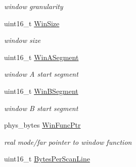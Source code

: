 \begin{DoxyCompactItemize}
\begin{DoxyCompactList}\small\item\em window granularity \end{DoxyCompactList}\item 
uint16\+\_\+t \hyperlink{struct____attribute_____ad26e754fe362f3085c7ec4c0e5e75a6f}{Win\+Size}\hypertarget{struct____attribute_____ad26e754fe362f3085c7ec4c0e5e75a6f}{}\label{struct____attribute_____ad26e754fe362f3085c7ec4c0e5e75a6f}

\begin{DoxyCompactList}\small\item\em window size \end{DoxyCompactList}\item 
uint16\+\_\+t \hyperlink{struct____attribute_____a7cde26f911e3df97b7498ee139d8de12}{Win\+A\+Segment}\hypertarget{struct____attribute_____a7cde26f911e3df97b7498ee139d8de12}{}\label{struct____attribute_____a7cde26f911e3df97b7498ee139d8de12}

\begin{DoxyCompactList}\small\item\em window A start segment \end{DoxyCompactList}\item 
uint16\+\_\+t \hyperlink{struct____attribute_____a6dbaac9ee1cae36ca0c7b46559264b69}{Win\+B\+Segment}\hypertarget{struct____attribute_____a6dbaac9ee1cae36ca0c7b46559264b69}{}\label{struct____attribute_____a6dbaac9ee1cae36ca0c7b46559264b69}

\begin{DoxyCompactList}\small\item\em window B start segment \end{DoxyCompactList}\item 
phys\+\_\+bytes \hyperlink{struct____attribute_____aa211c2411f48f899b0bb0739ecef0b37}{Win\+Func\+Ptr}\hypertarget{struct____attribute_____aa211c2411f48f899b0bb0739ecef0b37}{}\label{struct____attribute_____aa211c2411f48f899b0bb0739ecef0b37}

\begin{DoxyCompactList}\small\item\em real mode/far pointer to window function \end{DoxyCompactList}\item 
uint16\+\_\+t \hyperlink{struct____attribute_____a3c9eb4b107ecee102c6e63f9054ede06}{Bytes\+Per\+Scan\+Line}\hypertarget{struct____attribute_____a3c9eb4b107ecee102c6e63f9054ede06}{}\label{struct____attribute_____a3c9eb4b107ecee102c6e63f9054ede06}


\end{DoxyCompactItemize}
